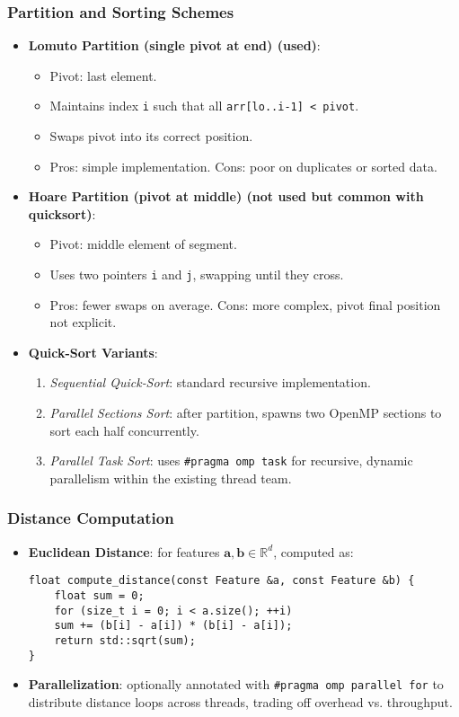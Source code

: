 \subsubsection{Partition and Sorting Schemes}
\begin{itemize}
\item \textbf{Lomuto Partition (single pivot at end) (used)}:
\begin{itemize}
\item Pivot: last element.
\item Maintains index \texttt{i} such that all \texttt{arr[lo..i-1] < pivot}.\item Swaps pivot into its correct position.
\item Pros: simple implementation.  Cons: poor on duplicates or sorted data.
\end{itemize}
\item \textbf{Hoare Partition (pivot at middle) (not used but common with quicksort)}:
\begin{itemize}
\item Pivot: middle element of segment.
\item Uses two pointers \texttt{i} and \texttt{j}, swapping until they cross.
\item Pros: fewer swaps on average.  Cons: more complex, pivot final position not explicit.
\end{itemize}
\item \textbf{Quick-Sort Variants}:
\begin{enumerate}
\item \emph{Sequential Quick‑Sort}: standard recursive implementation.
\item \emph{Parallel Sections Sort}: after partition, spawns two OpenMP sections to sort each half concurrently.
\item \emph{Parallel Task Sort}: uses \texttt{\#pragma omp task} for recursive, dynamic parallelism within the existing thread team.
\end{enumerate}
\end{itemize}

\subsubsection{Distance Computation}
\begin{itemize}
\item \textbf{Euclidean Distance}: for features $\mathbf{a},\mathbf{b}\in\mathbb{R}^d$, computed as:
\begin{verbatim}
float compute_distance(const Feature &a, const Feature &b) {
    float sum = 0;
    for (size_t i = 0; i < a.size(); ++i)
    sum += (b[i] - a[i]) * (b[i] - a[i]);
    return std::sqrt(sum);
}
\end{verbatim}
\item \textbf{Parallelization}: optionally annotated with \texttt{\#pragma omp parallel for} to distribute distance loops across threads, trading off overhead vs. throughput.
\end{itemize}

